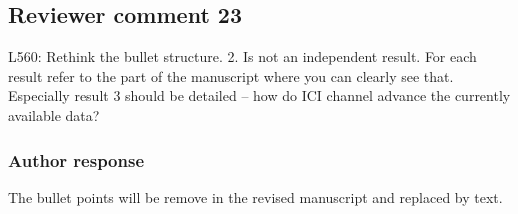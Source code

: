 \documentclass[11pt]{scrartcl}
\begin{document}
%

\subsection*{Reviewer comment 23}
L560:  Rethink the bullet structure.  2.  Is not an independent result.  For each result refer to the part of the manuscript where you can clearly see that.  Especially result 3 should be detailed – how do ICI channel advance the currently available data?

\subsubsection*{Author response}

The bullet points will be remove in the revised manuscript and replaced
by text.
\end{document}
